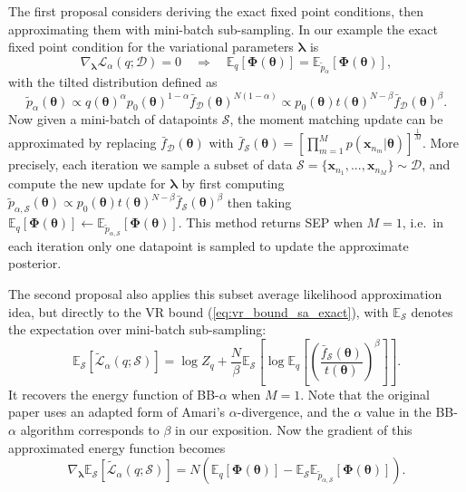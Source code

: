 The first proposal considers deriving the exact fixed point conditions, then approximating them with mini-batch sub-sampling. In our example the exact fixed point condition for the variational parameters $\bm{\lambda}$ is
\begin{equation}
\nabla_{\bm{\lambda}} \mathcal{L}_{\alpha}(q; \mathcal{D}) = 0 \quad \Rightarrow \quad \mathbb{E}_{q}[\bm{\Phi}(\bm{\theta})] = \mathbb{E}_{\tilde{p}_{\alpha}}[\bm{\Phi}(\bm{\theta})],
\end{equation} 
with the tilted distribution defined as 
$$\tilde{p}_{\alpha}(\bm{\theta}) \propto q(\bm{\theta})^{\alpha}p_0(\bm{\theta})^{1 - \alpha} \bar{f}_{\mathcal{D}}(\bm{\theta})^{N(1 - \alpha)} \propto p_0(\bm{\theta}) t(\bm{\theta})^{N - \beta} \bar{f}_{\mathcal{D}}(\bm{\theta})^{\beta}.$$ 
Now given a mini-batch of datapoints $\mathcal{S}$, the moment matching update can be approximated by replacing $\bar{f}_{\mathcal{D}}(\bm{\theta})$ with $\bar{f}_{\mathcal{S}}(\bm{\theta}) = [\prod_{m=1}^M p(\bm{x}_{n_m}|\bm{\theta})]^{\frac{1}{M}}$. More precisely, each iteration we sample a subset of data $\mathcal{S} = \{\bm{x}_{n_1}, ..., \bm{x}_{n_M} \} \sim \mathcal{D}$, and compute the new update for $\bm{\lambda}$ by first computing $\tilde{p}_{\alpha, \mathcal{S}}(\bm{\theta}) \propto p_0(\bm{\theta}) t(\bm{\theta})^{N - \beta} \bar{f}_{\mathcal{S}}(\bm{\theta})^{\beta}$ then taking $\mathbb{E}_{q}[\bm{\Phi}(\bm{\theta})] \leftarrow \mathbb{E}_{\tilde{p}_{\alpha, \mathcal{S}}}[\bm{\Phi}(\bm{\theta})]$. This method returns SEP when $M = 1$, i.e.~in each iteration only one datapoint is sampled to update the approximate posterior.

%
The second proposal also applies this subset average likelihood approximation idea, but directly to the VR bound (\ref{eq:vr_bound_sa_exact}), with $\mathbb{E}_{\mathcal{S}}$ denotes the expectation over mini-batch sub-sampling:
\begin{equation}
\mathbb{E}_{\mathcal{S}} \left[ \tilde{\mathcal{L}}_{\alpha}(q; \mathcal{S}) \right] = \log Z_q + \frac{N}{\beta} \mathbb{E}_{\mathcal{S}} \left[ \log \mathbb{E}_{q} \left[ \left( \frac{ \bar{f}_{\mathcal{S}}(\bm{\theta})} {t(\bm{\theta})} \right)^{\beta} \right] \right].
\label{eq:vr_bound_sa_approx}
\end{equation}
It recovers the energy function of BB-$\alpha$ when $M=1$. Note that the original paper \cite{hernandez-lobato:bb-alpha} uses an adapted form of Amari's $\alpha$-divergence, and the $\alpha$ value in the BB-$\alpha$ algorithm corresponds to $\beta$ in our exposition. Now the gradient of this approximated energy function becomes
\begin{equation}
\nabla_{\bm{\lambda}} \mathbb{E}_{\mathcal{S}} \left[ \tilde{\mathcal{L}}_{\alpha}(q; \mathcal{S}) \right] = N (\mathbb{E}_{q}[\bm{\Phi}(\bm{\theta})] - \mathbb{E}_{\mathcal{S}} \mathbb{E}_{\tilde{p}_{\alpha, \mathcal{S}}}[\bm{\Phi}(\bm{\theta})]).
\end{equation}

